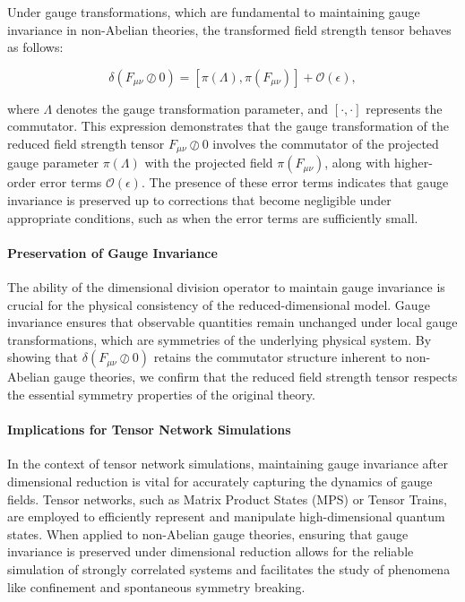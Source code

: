 \documentclass[sn-mathphys-num]{sn-jnl}
\theoremstyle{thmstyleone}
\theoremstyle{thmstyletwo}
\theoremstyle{thmstylethree}
\begin{document}
Under gauge transformations, which are fundamental to maintaining gauge invariance in non-Abelian theories, the transformed field strength tensor behaves as follows:

\[
\delta(F_{\mu\nu} \oslash 0) = [\pi(\Lambda), \pi(F_{\mu\nu})] + \mathcal{O}(\epsilon),
\]

where \( \Lambda \) denotes the gauge transformation parameter, and \( [\cdot,\cdot] \) represents the commutator. This expression demonstrates that the gauge transformation of the reduced field strength tensor \( F_{\mu\nu} \oslash 0 \) involves the commutator of the projected gauge parameter \( \pi(\Lambda) \) with the projected field \( \pi(F_{\mu\nu}) \), along with higher-order error terms \( \mathcal{O}(\epsilon) \). The presence of these error terms indicates that gauge invariance is preserved up to corrections that become negligible under appropriate conditions, such as when the error terms are sufficiently small.

\paragraph{Preservation of Gauge Invariance}

The ability of the dimensional division operator to maintain gauge invariance is crucial for the physical consistency of the reduced-dimensional model. Gauge invariance ensures that observable quantities remain unchanged under local gauge transformations, which are symmetries of the underlying physical system. By showing that \( \delta(F_{\mu\nu} \oslash 0) \) retains the commutator structure inherent to non-Abelian gauge theories, we confirm that the reduced field strength tensor respects the essential symmetry properties of the original theory.

\paragraph{Implications for Tensor Network Simulations}

In the context of tensor network simulations, maintaining gauge invariance after dimensional reduction is vital for accurately capturing the dynamics of gauge fields. Tensor networks, such as Matrix Product States (MPS) or Tensor Trains, are employed to efficiently represent and manipulate high-dimensional quantum states. When applied to non-Abelian gauge theories, ensuring that gauge invariance is preserved under dimensional reduction allows for the reliable simulation of strongly correlated systems and facilitates the study of phenomena like confinement and spontaneous symmetry breaking.
\end{document}
